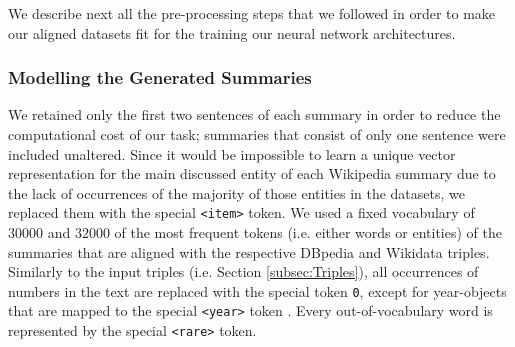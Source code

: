 \documentclass[preprint,5p]{elsarticle}
\begin{document}
We describe next all the pre-processing steps that we followed in order to make our aligned datasets fit for the training our neural network architectures.



\subsubsection{Modelling the Generated Summaries}
\label{subsubsec:ModellingGeneratedSummaries}

We retained only the first two sentences of each summary in order to reduce the computational cost of our task; summaries that consist of only one sentence were included unaltered. Since it would be impossible to learn a unique vector representation for the main discussed entity of each Wikipedia summary due to the lack of occurrences of the majority of those entities in the datasets, we replaced them with the special \texttt{<item>} token. We used a fixed vocabulary of $30000$ and $32000$ of the most frequent tokens (i.e. either words or entities) of the summaries that are aligned with the respective DBpedia and Wikidata triples. Similarly to the input triples (i.e. Section \ref{subsec:Triples}), all occurrences of numbers in the text are replaced with the special token \texttt{0}, except for year-objects that are mapped to the special \texttt{<year>} token \cite{Lebret2016}. Every out-of-vocabulary word is represented by the special \texttt{<rare>} token.
\end{document}

